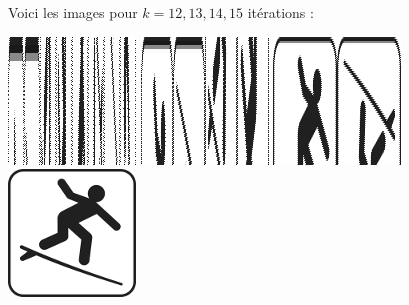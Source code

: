 \documentclass[11pt,class=report,crop=false]{standalone}
\begin{document}
\begin{cours}
Voici les images pour $k=12,13,14,15$ itérations :
\begin{center}
\includegraphics[scale=0.6]{images_fiche/surf_gimp_new_boul_12.png}\qquad
\includegraphics[scale=0.6]{images_fiche/surf_gimp_new_boul_13.png}\qquad
\includegraphics[scale=0.6]{images_fiche/surf_gimp_new_boul_14.png}\qquad
\includegraphics[scale=0.6]{images_fiche/surf_gimp_new_boul_15.png}
\end{center}
\end{cours}

\end{document}
